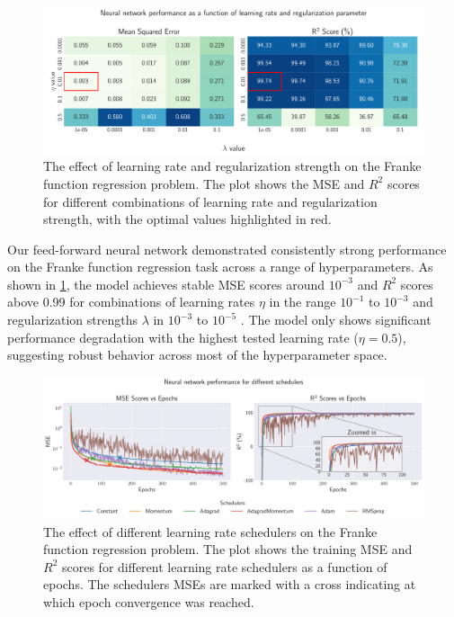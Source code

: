 \onecolumngrid
\begin{figure}[h!]
    \begin{minipage}{\textwidth}
        \centering
        \includegraphics[width = .9\textwidth]{../figs/c_eta_lambda.pdf}
        \caption{The effect of learning rate and regularization strength on the Franke function regression problem. The plot shows the MSE and \( R^2 \) scores for different combinations of learning rate and regularization strength, with the optimal values highlighted in red.}
        \label{fig:NN_Franke_eta_lambda}
    \end{minipage}
\end{figure}
\twocolumngrid

Our feed-forward neural network demonstrated consistently strong performance on the Franke function regression task across a range of hyperparameters. As shown in \cref{fig:NN_Franke_eta_lambda}, the model achieves stable MSE scores around $10^{-3}$ and $R^2$ scores above 0.99 for combinations of learning rates $ \eta $ in the range $ 10^{-1} $ to $ 10^{-3}$ and regularization strengths $ \lambda $ in $ 10^{-3} $ to $ 10^{-5}$ . The model only shows significant performance degradation with the highest tested learning rate ($\eta = 0.5$), suggesting robust behavior across most of the hyperparameter space.

\onecolumngrid
\begin{figure}[h!]
    \begin{minipage}{\textwidth}
        \centering
        \includegraphics[width = .9\textwidth]{../figs/b_schedulers.pdf}
        \caption{The effect of different learning rate schedulers on the Franke function regression problem. The plot shows the training MSE and \( R^2 \) scores for different learning rate schedulers as a function of epochs. The schedulers MSEs are marked with a cross indicating at which epoch convergence was reached.}
        \label{fig:NN_Franke_schedulers}
    \end{minipage}
\end{figure}
\twocolumngrid

